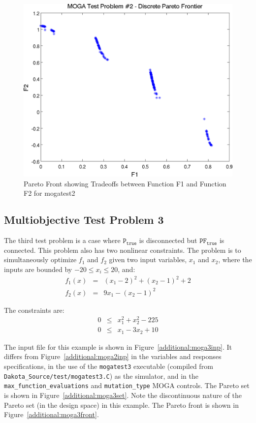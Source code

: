 \begin{figure}
  \centering
  \includegraphics[scale=0.75]{images/dakota_mogatest2_pareto_front}
  \caption{Pareto Front showing Tradeoffs between Function F1 and
    Function F2 for mogatest2}
  \label{additional:moga2front}
\end{figure}

\subsection{Multiobjective Test Problem 3}\label{additional:multiobjective:problem3}

The third test problem is a case where $\mathtt{P_{true}}$ is
disconnected but $\mathtt{PF_{true}}$ is connected. 
This problem also has two
nonlinear constraints. The problem is to simultaneously optimize
$f_1$ and $f_2$ given two input variables, $x_1$ and $x_2$,
where the inputs are bounded by $-20 \leq x_{i} \leq 20$, and:
\begin{eqnarray*}
f_1(x) &=& (x_1-2)^2+(x_2-1)^2+2 \\
f_2(x) &=& 9x_1-(x_2-1)^2
\end{eqnarray*}

The constraints are:
\begin{eqnarray*}
0 &\leq& x_1^2+x_2^2-225 \\
0 &\leq& x_1-3x_2+10
\end{eqnarray*}

The input file for this example is shown in
Figure~\ref{additional:moga3inp}. It differs from
Figure~\ref{additional:moga2inp} in the variables and responses
specifications, in the use of the \texttt{mogatest3} executable
(compiled from \texttt{Dakota\_Source/test/mogatest3.C}) as the simulator, and
in the \texttt{max\_function\_evaluations} and \texttt{mutation\_type}
MOGA controls. The Pareto set is shown in
Figure~\ref{additional:moga3set}. Note the discontinuous nature of the
Pareto set (in the design space) in this example. The Pareto front is
shown in Figure~\ref{additional:moga3front}.

